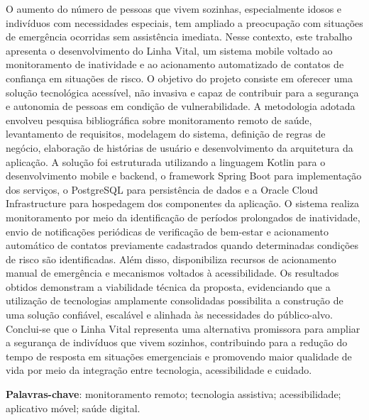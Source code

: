 \begin{resumo}

O aumento do número de pessoas que vivem sozinhas, especialmente idosos e indivíduos com necessidades especiais, tem ampliado a preocupação com situações de emergência ocorridas sem assistência imediata. Nesse contexto, este trabalho apresenta o desenvolvimento do Linha Vital, um sistema mobile voltado ao monitoramento de inatividade e ao acionamento automatizado de contatos de confiança em situações de risco. O objetivo do projeto consiste em oferecer uma solução tecnológica acessível, não invasiva e capaz de contribuir para a segurança e autonomia de pessoas em condição de vulnerabilidade. A metodologia adotada envolveu pesquisa bibliográfica sobre monitoramento remoto de saúde, levantamento de requisitos, modelagem do sistema, definição de regras de negócio, elaboração de histórias de usuário e desenvolvimento da arquitetura da aplicação. A solução foi estruturada utilizando a linguagem Kotlin para o desenvolvimento mobile e backend, o framework Spring Boot para implementação dos serviços, o PostgreSQL para persistência de dados e a Oracle Cloud Infrastructure para hospedagem dos componentes da aplicação. O sistema realiza monitoramento por meio da identificação de períodos prolongados de inatividade, envio de notificações periódicas de verificação de bem-estar e acionamento automático de contatos previamente cadastrados quando determinadas condições de risco são identificadas. Além disso, disponibiliza recursos de acionamento manual de emergência e mecanismos voltados à acessibilidade. Os resultados obtidos demonstram a viabilidade técnica da proposta, evidenciando que a utilização de tecnologias amplamente consolidadas possibilita a construção de uma solução confiável, escalável e alinhada às necessidades do público-alvo. Conclui-se que o Linha Vital representa uma alternativa promissora para ampliar a segurança de indivíduos que vivem sozinhos, contribuindo para a redução do tempo de resposta em situações emergenciais e promovendo maior qualidade de vida por meio da integração entre tecnologia, acessibilidade e cuidado.

\vspace{\onelineskip}
\noindent
\textbf{Palavras-chave}: monitoramento remoto; tecnologia assistiva; acessibilidade; aplicativo móvel; saúde digital.
\end{resumo}